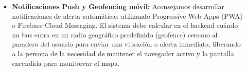 \begin{itemize}
    \item \textbf{Notificaciones Push y Geofencing móvil:} Aconsejamos desarrollar notificaciones de alerta automáticas utilizando Progressive Web Apps (PWA) o Firebase Cloud Messaging. El sistema debe calcular en el backend cuándo un bus entra en un radio geográfico predefinido (geofence) cercano al paradero del usuario para enviar una vibración o alerta inmediata, liberando a la persona de la necesidad de mantener el navegador activo y la pantalla encendida para monitorear el mapa.
\end{itemize}
